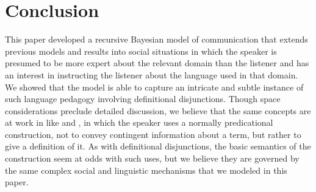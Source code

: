 \section{Conclusion}\label{sec:conclusion}


This paper developed a recursive Bayesian model of communication that
extends previous models and results into social situations in which
the speaker is presumed to be more expert about the relevant domain
than the listener and has an interest in instructing the listener
about the language used in that domain.  We showed that the model is
able to capture an intricate and subtle instance of such language
pedagogy involving definitional disjunctions.  Though space
considerations preclude detailed discussion, we believe that the same
concepts are at work in  like
 and , in which the speaker uses a normally predicational
construction, not to convey contingent information about a term, but
rather to give a definition of it. As with definitional disjunctions,
the basic semantics of the construction seem at odds with such uses,
but we believe they are governed by the same complex social and
linguistic mechanisms that we modeled in this paper.


